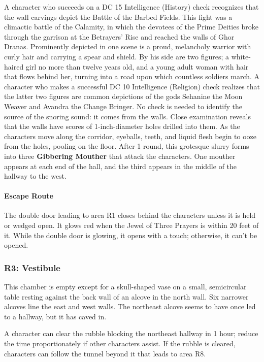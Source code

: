 \documentclass[10pt,a4,twoside,twocolumn,openany,nodeprecatedcode]{dndbook}
\begin{document}
A character who succeeds on a DC 15 Intelligence (History) check recognizes that the wall carvings depict the Battle of the Barbed Fields. This fight was a climactic battle of the Calamity, in which the devotees of the Prime Deities broke through the garrison at the Betrayers' Rise and reached the walls of Ghor Dranas. Prominently depicted in one scene is a proud, melancholy warrior with curly hair and carrying a spear and shield. By his side are two figures; a white-haired girl no more than twelve years old, and a young adult woman with hair that flows behind her, turning into a road upon which countless soldiers march. A character who makes a successful DC 10 Intelligence (Religion) check realizes that the latter two figures are common depictions of the gods Sehanine the Moon Weaver and Avandra the Change Bringer.
No check is needed to identify the source of the snoring sound: it comes from the walls. Close examination reveals that the walls have scores of 1-inch-diameter holes drilled into them. As the characters move along the corridor, eyeballs, teeth, and liquid flesh begin to ooze from the holes, pooling on the floor. After 1 round, this grotesque slurry forms into three \textbf{Gibbering Mouther} that attack the characters. One mouther appears at each end of the hall, and the third appears in the middle of the hallway to the west.
\paragraph{Escape Route}
The double door leading to area R1 closes behind the characters unless it is held or wedged open. It glows red when the Jewel of Three Prayers is within 20 feet of it. While the double door is glowing, it opens with a touch; otherwise, it can't be opened.
\subsubsection{R3: Vestibule}
\begin{DndReadAloud}{}
This chamber is empty except for a skull-shaped vase on a small, semicircular table resting against the back wall of an alcove in the north wall. Six narrower alcoves line the east and west walls. The northeast alcove seems to have once led to a hallway, but it has caved in.
\end{DndReadAloud}

A character can clear the rubble blocking the northeast hallway in 1 hour; reduce the time proportionately if other characters assist. If the rubble is cleared, characters can follow the tunnel beyond it that leads to area R8.
\end{document}

